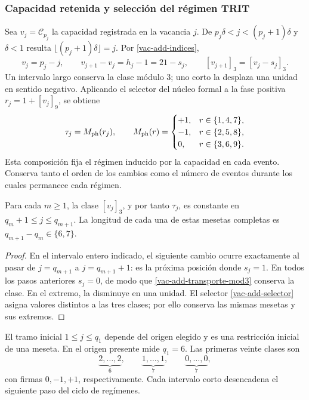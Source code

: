 \subsubsection{Capacidad retenida y selección del régimen TRIT}
\label{vac-add-regimen}

Sea \(v_j=\mathcal C_{p_j}\) la capacidad registrada en la vacancia
\(j\). De \(p_j\delta<j<(p_j+1)\delta\) y \(\delta<1\) resulta
\(\lfloor(p_j+1)\delta\rfloor=j\). Por
\eqref{vac-add-indices},
\begin{equation}
 v_j=p_j-j,
 \qquad v_{j+1}-v_j=h_j-1=21-s_j,
 \qquad [v_{j+1}]_3=[v_j-s_j]_3.
 \label{vac-add-transporte-mod3}
\end{equation}
Un intervalo largo conserva la clase módulo \(3\); uno corto la
desplaza una unidad en sentido negativo. Aplicando el selector del
núcleo formal a la fase positiva \(r_j=1+[v_j]_9\), se obtiene
\begin{equation}
 \tau_j=M_{\rm ph}(r_j),\qquad
 M_{\rm ph}(r)=
 \begin{cases}
 +1,&r\in\{1,4,7\},\\
 -1,&r\in\{2,5,8\},\\
 0,&r\in\{3,6,9\}.
 \end{cases}
 \label{vac-add-selector}
\end{equation}
Esta composición fija el régimen inducido por la capacidad en cada
evento. Conserva tanto el orden de los cambios como el número de
eventos durante los cuales permanece cada régimen.

\begin{corollary}
\label{vac-add-mesetas}
Para cada \(m\geq1\), la clase \([v_j]_3\), y por tanto
\(\tau_j\), es constante en
\(q_m+1\leq j\leq q_{m+1}\). La longitud de cada una de estas
mesetas completas es \(q_{m+1}-q_m\in\{6,7\}\).
\end{corollary}
\begin{proof}
En el intervalo entero indicado, el siguiente cambio ocurre exactamente
al pasar de \(j=q_{m+1}\) a \(j=q_{m+1}+1\): es la próxima posición
donde \(s_j=1\). En todos los pasos anteriores \(s_j=0\), de modo
que \eqref{vac-add-transporte-mod3} conserva la clase. En el extremo,
la disminuye en una unidad. El selector \eqref{vac-add-selector}
asigna valores distintos a las tres clases; por ello conserva las
mismas mesetas y sus extremos.
\end{proof}

El tramo inicial \(1\leq j\leq q_1\) depende del origen elegido y
es una restricción inicial de una meseta. En el origen presente mide
\(q_1=6\). Las primeras veinte clases son
\[
 \underbrace{2,\ldots,2}_{6},\qquad
 \underbrace{1,\ldots,1}_{7},\qquad
 \underbrace{0,\ldots,0}_{7},
\]
con firmas \(0,-1,+1\), respectivamente. Cada intervalo corto
desencadena el siguiente paso del ciclo de regímenes.

